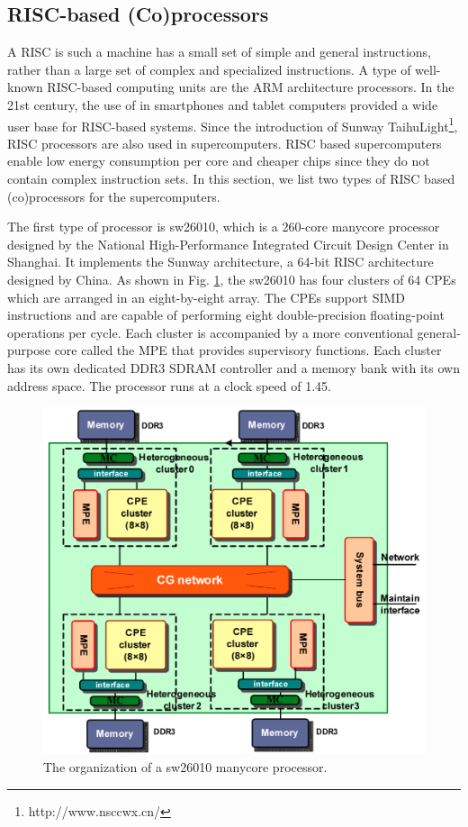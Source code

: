 \subsection{RISC-based (Co)processors}

A RISC  is such a machine has a small set of simple and general instructions, rather than a large set of complex and specialized instructions. A type of well-known RISC-based computing units are the ARM architecture processors. In the 21st century, the use of in smartphones and tablet computers provided a wide user base for RISC-based systems. Since the introduction of Sunway TaihuLight\footnote{http://www.nsccwx.cn/}, RISC processors are also used in supercomputers. RISC based supercomputers enable low energy consumption per core and cheaper chips since they do not contain complex instruction sets. In this section, we list two types of RISC based (co)processors for the supercomputers.

The first type of processor is sw26010, which is a 260-core manycore processor \cite{fu2016sunway} designed by the National High-Performance Integrated Circuit Design Center in Shanghai. It implements the Sunway architecture, a 64-bit RISC architecture designed by China. As shown in Fig. \ref{fig:sw26010}, the sw26010 has four clusters of 64 CPEs which are arranged in an eight-by-eight array. The CPEs support SIMD instructions and are capable of performing eight double-precision floating-point operations per cycle. Each cluster is accompanied by a more conventional general-purpose core called the MPE that provides supervisory functions. Each cluster has its own dedicated DDR3 SDRAM controller and a memory bank with its own address space. The processor runs at a clock speed of 1.45.

\begin{figure}[t]
	\centering
	\includegraphics[width=0.81\linewidth]{fig/sw26010.png}
	\caption{The organization of a sw26010 manycore processor.}
	\label{fig:sw26010}
\end{figure}

